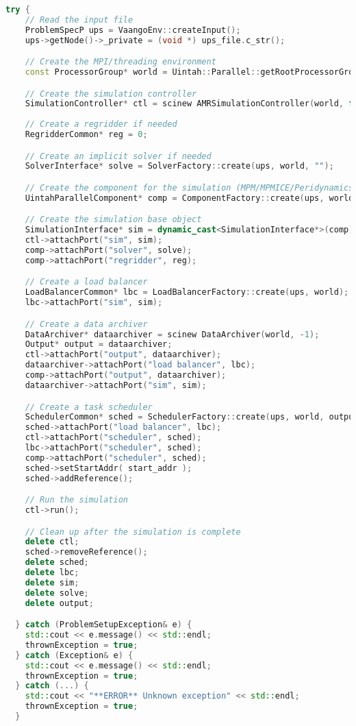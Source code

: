 \begin{lstlisting}[language=Cpp]
 try {
    // Read the input file
    ProblemSpecP ups = VaangoEnv::createInput();
    ups->getNode()->_private = (void *) ups_file.c_str();

    // Create the MPI/threading environment
    const ProcessorGroup* world = Uintah::Parallel::getRootProcessorGroup();

    // Create the simulation controller
    SimulationController* ctl = scinew AMRSimulationController(world, false, ups);
    
    // Create a regridder if needed
    RegridderCommon* reg = 0;

    // Create an implicit solver if needed
    SolverInterface* solve = SolverFactory::create(ups, world, "");

    // Create the component for the simulation (MPM/MPMICE/Peridynamics)
    UintahParallelComponent* comp = ComponentFactory::create(ups, world, false, "");

    // Create the simulation base object
    SimulationInterface* sim = dynamic_cast<SimulationInterface*>(comp);
    ctl->attachPort("sim", sim);
    comp->attachPort("solver", solve);
    comp->attachPort("regridder", reg);

    // Create a load balancer
    LoadBalancerCommon* lbc = LoadBalancerFactory::create(ups, world);
    lbc->attachPort("sim", sim);

    // Create a data archiver
    DataArchiver* dataarchiver = scinew DataArchiver(world, -1);
    Output* output = dataarchiver;
    ctl->attachPort("output", dataarchiver);
    dataarchiver->attachPort("load balancer", lbc);
    comp->attachPort("output", dataarchiver);
    dataarchiver->attachPort("sim", sim);

    // Create a task scheduler
    SchedulerCommon* sched = SchedulerFactory::create(ups, world, output);
    sched->attachPort("load balancer", lbc);
    ctl->attachPort("scheduler", sched);
    lbc->attachPort("scheduler", sched);
    comp->attachPort("scheduler", sched);
    sched->setStartAddr( start_addr );
    sched->addReference();

    // Run the simulation
    ctl->run();

    // Clean up after the simulation is complete
    delete ctl;
    sched->removeReference();
    delete sched;
    delete lbc;
    delete sim;
    delete solve;
    delete output; 

  } catch (ProblemSetupException& e) {
    std::cout << e.message() << std::endl;
    thrownException = true;
  } catch (Exception& e) {
    std::cout << e.message() << std::endl;
    thrownException = true;
  } catch (...) {
    std::cout << "**ERROR** Unknown exception" << std::endl;
    thrownException = true;
  }
\end{lstlisting}
